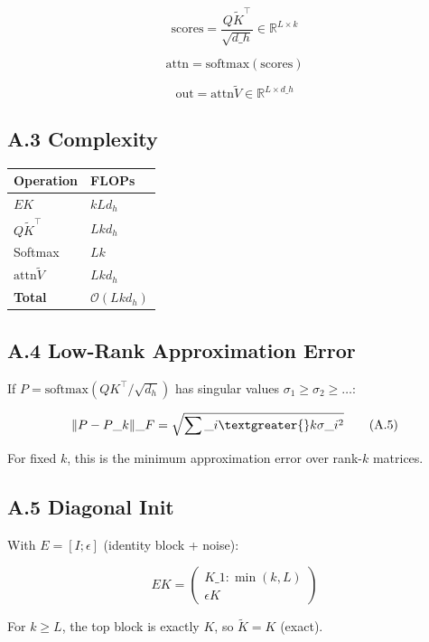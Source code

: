 \[
\text{scores} = \frac{Q \tilde{K}^\top}{\sqrt{d\_h}} \in \mathbb{R}^{L \times k}
\tag{A.2}
\]

\[
\text{attn} = \text{softmax}(\text{scores})
\tag{A.3}
\]

\[
\text{out} = \text{attn} \tilde{V} \in \mathbb{R}^{L \times d\_h}
\tag{A.4}
\]

\subsection{A.3 Complexity}

\begin{table}[H]
\centering
\small
\begin{tabular}{ll}
\toprule
\textbf{Operation} & \textbf{FLOPs} \\
\midrule
$E K$ & $k L d_h$ \\
$Q \tilde{K}^\top$ & $L k d_h$ \\
Softmax & $L k$ \\
$\text{attn} \tilde{V}$ & $L k d_h$ \\
\textbf{Total} & $\mathcal{O}(L k d_h)$ \\
\bottomrule
\end{tabular}
\end{table}

\subsection{A.4 Low-Rank Approximation Error}

If $P = \text{softmax}(QK^\top/\sqrt{d_h})$ has singular values $\sigma_1 \geq \sigma_2 \geq \dots$:

\[
\|P - P\_k\|\_F = \sqrt{\sum\_{i \textgreater{} k} \sigma\_i^2}
\tag{A.5}
\]

For fixed $k$, this is the minimum approximation error over rank-$k$ matrices.

\subsection{A.5 Diagonal Init}

With $E = [I; \epsilon]$ (identity block + noise):

\[
E K = \begin{pmatrix} K\_{1:\min(k,L)} \\ \epsilon K \end{pmatrix}
\tag{A.6}
\]

For $k \geq L$, the top block is exactly $K$, so $\tilde{K} = K$ (exact).

